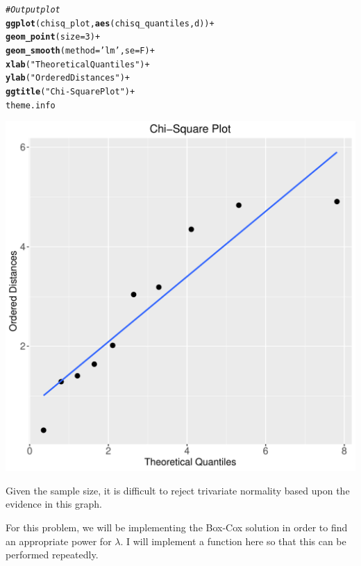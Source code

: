\documentclass[12pt]{article}\usepackage[]{graphicx}\usepackage[]{color}
\makeatletter
\def\maxwidth{ %
  \ifdim\Gin@nat@width>\linewidth
    \linewidth
  \else
    \Gin@nat@width
  \fi
}
\newcommand{\hlnum}[1]{\textcolor[rgb]{0.686,0.059,0.569}{#1}}%
\newcommand{\hlstr}[1]{\textcolor[rgb]{0.192,0.494,0.8}{#1}}%
\newcommand{\hlcom}[1]{\textcolor[rgb]{0.678,0.584,0.686}{\textit{#1}}}%
\newcommand{\hlopt}[1]{\textcolor[rgb]{0,0,0}{#1}}%
\newcommand{\hlstd}[1]{\textcolor[rgb]{0.345,0.345,0.345}{#1}}%
\newcommand{\hlkwc}[1]{\textcolor[rgb]{0.333,0.667,0.333}{#1}}%
\newcommand{\hlkwd}[1]{\textcolor[rgb]{0.737,0.353,0.396}{\textbf{#1}}}%
\newenvironment{kframe}{%
 \def\at@end@of@kframe{}%
 \ifinner\ifhmode%
  \def\at@end@of@kframe{\end{minipage}}%
  \begin{minipage}{\columnwidth}%
 \fi\fi%
 \def\FrameCommand##1{\hskip\@totalleftmargin \hskip-\fboxsep
 \colorbox{shadecolor}{##1}\hskip-\fboxsep
     \hskip-\linewidth \hskip-\@totalleftmargin \hskip\columnwidth}%
 \MakeFramed {\advance\hsize-\width
   \@totalleftmargin\z@ \linewidth\hsize
   \@setminipage}}%
 {\par\unskip\endMakeFramed%
 \at@end@of@kframe}
\newenvironment{knitrout}{}{} %
\newenvironment{problem}[2][Problem]{\begin{trivlist}
\item[\hskip \labelsep {\bfseries #1}\hskip \labelsep {\bfseries #2.}]}{\end{trivlist}}
\makeatother
\begin{document}
\begin{knitrout}
\begin{kframe}
\begin{alltt}
\hlcom{#Output plot}
\hlkwd{ggplot}\hlstd{(chisq_plot,} \hlkwd{aes}\hlstd{(chisq_quantiles, d))} \hlopt{+}
  \hlkwd{geom_point}\hlstd{(}\hlkwc{size}\hlstd{=}\hlnum{3}\hlstd{)} \hlopt{+}
  \hlkwd{geom_smooth}\hlstd{(}\hlkwc{method}\hlstd{=}\hlstr{'lm'}\hlstd{,} \hlkwc{se}\hlstd{=F)} \hlopt{+}
  \hlkwd{xlab}\hlstd{(}\hlstr{"Theoretical Quantiles"}\hlstd{)} \hlopt{+}
  \hlkwd{ylab}\hlstd{(}\hlstr{"Ordered Distances"}\hlstd{)} \hlopt{+}
  \hlkwd{ggtitle}\hlstd{(}\hlstr{"Chi-Square Plot"}\hlstd{)} \hlopt{+}
  \hlstd{theme.info}
\end{alltt}
\end{kframe}
\includegraphics[width=\maxwidth]{figure/unnamed-chunk-9-1} 

\end{knitrout}

Given the sample size, it is difficult to reject trivariate normality based upon the evidence in this graph.

\newpage
\begin{problem}{4.30}
\end{problem}

For this problem, we will be implementing the Box-Cox solution in order to find an appropriate power for $\lambda$. I will implement a function here so that this can be performed repeatedly.
\end{document}
